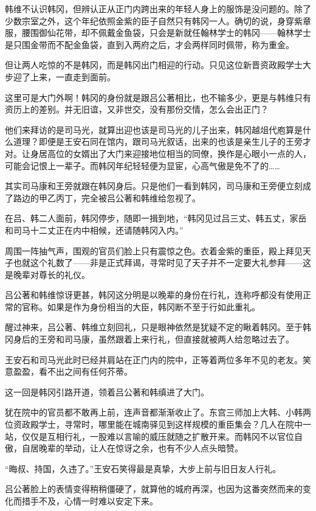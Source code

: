 韩维不认识韩冈，但辨认正从正门内跨出来的年轻人身上的服饰是没问题的。除了少数宗室之外，这个年纪依照金紫的臣子自然只有韩冈一人。确切的说，身穿紫章服，腰围御仙花带，却不佩戴金鱼袋，只会是新就任翰林学士的韩冈——翰林学士是只围金带而不配金鱼袋，直到入两府之后，才会两样同时佩带，称为重金。

但让两人吃惊的不是韩冈，而是韩冈出门相迎的行动。只见这位新晋资政殿学士大步迎了上来，一直走到面前。

这里可是大门外啊！韩冈的身份就是跟吕公著相比，也不输多少，更是与韩维只有资历上的差别。并无旧谊，又非世交，没有那份交情，怎么会出正门？

他们来拜访的是司马光，就算出迎也该是司马光的儿子出来，韩冈越俎代庖算是什么道理？即便是王安石同在馆内，跟司马光叙话，出来的也该是亲生儿子的王旁才对。让身居高位的女婿出了大门来迎接地位相当的同僚，换作是心眼小一点的人，可能会记恨上一辈子。而韩冈年纪轻轻便为显宦，心高气傲是免不了的……

其实司马康和王旁就跟在韩冈身后。只是他们一看到韩冈，司马康和王旁便立刻成了路边的甲乙丙丁，完全被吕公著和韩维给忽视了。

在吕、韩二人面前，韩冈停步，随即一揖到地，“韩冈见过吕三丈、韩五丈，家岳和司马十二丈正在内中相候，还请随韩冈入内。”

周围一阵抽气声，围观的官员们脸上只有震惊之色。衣着金紫的重臣，殿上拜见天子也就这个礼数了——非是正式拜谒，寻常时见了天子并不一定要大礼参拜——这是晚辈对尊长的礼仪。

吕公著和韩维惊讶更甚，韩冈这分明是以晚辈的身份在行礼，连称呼都没有使用正常的官称。如果是作为身份相当的大臣，韩冈断不至于行如此重礼。

醒过神来，吕公著、韩维立刻回礼，只是眼神依然是犹疑不定的瞅着韩冈。至于韩冈身后的王旁和司马康，虽然跟着上来行礼，但直接就被两人给忽略过去了。

王安石和司马光此时已经并肩站在正门内的院中，正等着两位多年不见的老友。笑意盈盈，看不出之间有任何芥蒂。

这一回是韩冈引路开道，领着吕公著和韩缜进了大门。

犹在院中的官员都不敢再上前，连声音都渐渐收止了。东宫三师加上大韩、小韩两位资政殿学士，寻常时，哪里能在城南驿见到这样规模的重臣集会？几人在院中一站，仅仅是互相行礼，一股难以言喻的威压就随之扩散开来。而韩冈不以官位自傲，自居晚辈的举动，让人在惊讶之余，也有不少人点头暗赞。

“晦叔、持国，久违了。”王安石笑得最是真挚，大步上前与旧日友人行礼。

吕公著脸上的表情变得稍稍僵硬了，就算他的城府再深，也因为这番突然而来的变化而措手不及，心情一时难以安定下来。

